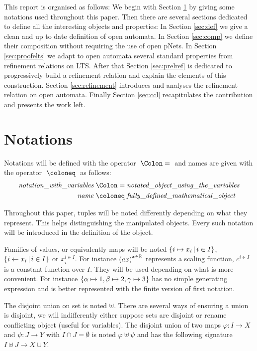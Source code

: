 \documentclass{article}
\begin{document}
This report is organised as follows:
We begin with Section \ref{sec:notations} by giving some notations used throughout this paper.
Then there are several sections dedicated to define all the interesting objects and properties:
In Section \ref{sec:def} we give a clean and up to date definition of open automata.
In Section \ref{sec:comp} we define their composition without requiring the use of open pNets.
In Section \ref{sec:proofelts} we adapt to open automata several standard properties from refinement relations on LTS.
After that Section \ref{sec:prelref} is dedicated to progressively build a refinement relation and explain the elements of this construction.
Section \ref{sec:refinement} introduces and analyses the refinement relation on open automata.
Finally Section \ref{sec:ccl} recapitulates the contribution and presents the work left.


\section{Notations}\label{sec:notations}
Notations will be defined with the operator \(\defnotation\) and names are given with the operator \(\defobject\) as follows:
\begin{align*}
	\mathit{notation\_with\_variables} & \defnotation \mathit{notated\_object\_using\_the\_variables} \\
	\mathit{name} & \defobject \mathit{fully\_defined\_mathematical\_object}
\end{align*}

Throughout this paper, tuples will be noted differently depending on what they represent.
This helps distinguishing the manipulated objects.
Every such notation will be introduced in the definition of the object.

Families of values, or equivalently maps will be noted \({\left\{i \mapsto x_i\,\middle|\, i \in I\right\}}\), \({\left\{i \gets x_i\,\middle|\, i \in I\right\}}\) or \(x_i^{i \in I}\).
For instance \({\left(ax\right)}^{x \in \mathbb{R}}\) represents a scaling function, \(c^{i \in I}\) is a constant function over \(I\).
They will be used depending on what is more convenient.
For instance \({\left\{\alpha \mapsto 1, \beta \mapsto 2, \gamma \mapsto 3\right\}}\) has no simple generating expression and is better represented with the finite version of first notation.

The disjoint union on set is noted \(\uplus\).
There are several ways of ensuring a union is disjoint, we will indifferently either suppose sets are disjoint or rename conflicting object (useful for variables).
The disjoint union of two maps \(\varphi: I \to X\) and \(\psi: J \to Y\) with \(I \cap J = \emptyset\) is noted \(\varphi \uplus \psi\) and has the following signature \(I \uplus J \to X \cup Y\).
\end{document}
